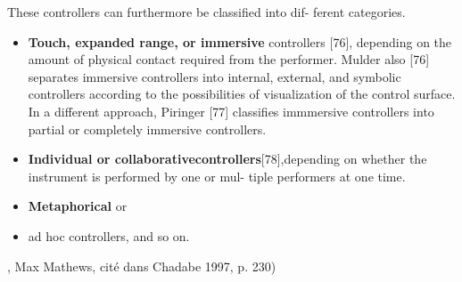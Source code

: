 These controllers can furthermore be classified into dif- ferent categories.
\begin{itemize}[noitemsep]
\item \textbf{Touch, expanded range, or immersive} controllers [76], depending on the amount of physical contact required from the performer. Mulder also [76] separates immersive controllers into internal, external, and symbolic controllers according to the possibilities of visualization of the control surface. In a different approach, Piringer [77] classifies immmersive controllers into partial or completely immersive controllers.
\item \textbf{Individual or collaborativecontrollers}[78],depending on whether the instrument is performed by one or mul- tiple performers at one time.
\item \textbf{Metaphorical} or \item{ad hoc} controllers, and so on.
\end{itemize}




 \cite{bin_hands_2017}

, Max Mathews, cité dans  Chadabe 1997, p. 230)